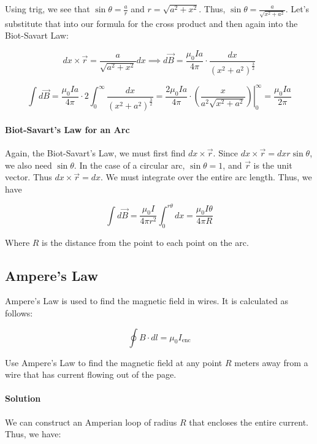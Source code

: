 \documentclass{scrartcl}
\theoremstyle{definition}
\begin{document}
	\noindent Using trig, we see that $\sin \theta = \frac{a}{r}$ and $r = \sqrt{a^2 + x^2}$. Thus, $\sin \theta = \frac{a}{\sqrt{x^2+a^2}}$. Let's substitute that into our formula for the cross product and then again into the Biot-Savart Law:
	
	$$
	dx \times \vec{r} = \frac{a}{\sqrt{a^2+x^2}} dx \implies d\vec{B} = \frac{\mu_0 I a}{4 \pi} \cdot \frac{dx}{\left(x^2+a^2\right)^\frac{3}{2}}
	$$
	
	$$
	\int d\vec{B} = \frac{\mu_0 I a}{4 \pi} \cdot 2 \int_0^\infty \frac{dx}{(x^2+a^2)^\frac{3}{2}} = \frac{2\mu_0 I a}{4 \pi} \cdot 
	\left. \left( \frac{x}{a^2\sqrt{x^2+a^2}} \right)\right|_0^\infty =  \frac{\mu_0 I a}{2 \pi}
	$$
	
	\paragraph{Biot-Savart's Law for an Arc} Again, the Biot-Savart's Law, we must first find $dx \times \vec{r}$. Since $dx \times \vec{r} = dx r \sin \theta$, we also need $\sin \theta$. In the case of a circular arc, $\sin \theta = 1$, and $\vec{r}$ is the unit vector. Thus $dx \times \vec{r} = dx$. We must integrate over the entire arc length. Thus, we have
	
	$$
	\int d \vec{B}= \frac{\mu_0 I}{4 \pi r^2} \int_0^{r \theta} dx = \frac{\mu_0 I \theta}{4 \pi R}
	$$
	
	\noindent Where $R$ is the distance from the point to each point on the arc.
	
	\subsection{Ampere's Law}	
	
	\begin{theorem}
		Ampere's Law is used to find the magnetic field in wires. It is calculated as follows:
		
		$$
		\oint B \cdot dl = \mu_0 I_\text{enc}
		$$
	\end{theorem}
	
	\begin{example}
			Use Ampere's Law to find the magnetic field at any point $R$ meters away from a wire that has current flowing out of the page.
	\end{example}
	
	\paragraph{Solution} We can construct an Amperian loop of radius $R$ that encloses the entire current. Thus, we have:
	
\end{document}
